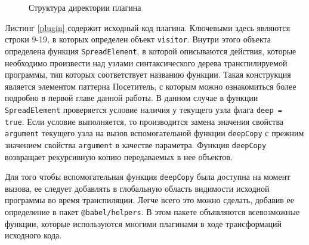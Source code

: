 \documentclass[14pt, a4paper]{article}
\def\code#1{\texttt{#1}} %
\begin{document}
\begin{figure}[H]
  \centering
  \caption{Структура директории плагина}
  \label{babel_plugin_dirs}
  \end{figure}

Листинг \ref{plugin} содержит исходный код плагина. Ключевыми здесь являются строки 9-19, в которых определен 
объект \code{visitor}. Внутри этого объекта определена функция \code{SpreadElement}, в которой описываются
действия, которые необходимо произвести над узлами синтаксического дерева транспилируемой программы, 
тип которых соответствует названию функции. Такая конструкция является элементом паттерна Посетитель, с которым 
можно ознакомиться более подробно в первой главе данной работы. В данном случае в функции \code{SpreadElement}
проверяется условие наличия у текущего узла флага \code{deep = true}. Если условие выполняется, то 
производится замена значения свойства \code{argument} текущего узла на вызов вспомогательной функции \code{deepCopy} 
с прежним значением свойства \code{argument} в качестве параметра. 
Функция \code{deepCopy} возвращает рекурсивную копию передаваемых в нее объектов.




Для того чтобы вспомогательная функция \code{deepCopy} была доступна на момент вызова, ее следует 
добавлять в глобальную область видимости исходной программы во время транспиляции. Легче всего это можно сделать,
добавив ее определение в пакет \code{@babel/helpers}. В этом пакете объявляются всевозможные функции,
которые используются многими плагинами в ходе трансформаций исходного кода.

\end{document}
